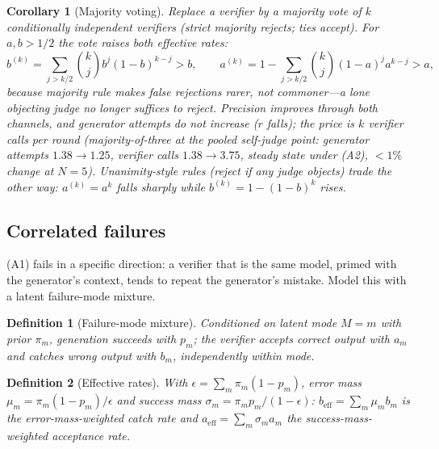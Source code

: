 \documentclass[10pt]{article}
\newtheorem{corollary}{Corollary}
\newtheorem{definition}{Definition}
\begin{document}
\begin{corollary}[Majority voting]\label{cor:majority}
Replace a verifier by a majority vote of $k$ conditionally
independent verifiers (strict majority rejects; ties accept).  For
$a, b > 1/2$ the vote raises \emph{both} effective rates:
\[
b^{(k)} = \sum_{j>k/2}\binom{k}{j}b^j(1-b)^{k-j} > b, \qquad
a^{(k)} = 1 - \sum_{j>k/2}\binom{k}{j}(1-a)^j a^{k-j} > a,
\]
because majority rule makes false rejections \emph{rarer}, not
commoner---a lone objecting judge no longer suffices to reject.
Precision improves through both channels, and generator attempts
do not increase ($r$ falls); the price is $k$ verifier calls per
round (majority-of-three at the pooled self-judge point:
generator attempts $1.38 \to 1.25$, verifier calls $1.38 \to
3.75$, steady state under (A2), $<1\%$ change at $N{=}5$).
Unanimity-style rules (reject if any judge objects) trade the
other way: $a^{(k)} = a^k$ falls sharply while $b^{(k)} =
1-(1-b)^k$ rises.
\end{corollary}

\subsection{Correlated failures}\label{sec:mixture}

(A1) fails in a specific direction: a verifier that is the same
model, primed with the generator's context, tends to repeat the
generator's mistake.  Model this with a latent failure-mode mixture.

\begin{definition}[Failure-mode mixture]\label{def:mixture}
Conditioned on latent mode $M=m$ with prior $\pi_m$, generation
succeeds with $p_m$; the verifier accepts correct output with
$a_m$ and catches wrong output with $b_m$, independently within
mode.
\end{definition}

\begin{definition}[Effective rates]\label{def:beff}
With $\epsilon = \sum_m \pi_m(1-p_m)$, error mass
$\mu_m = \pi_m(1-p_m)/\epsilon$ and success mass
$\sigma_m = \pi_m p_m/(1-\epsilon)$:
$b_{\mathrm{eff}} = \sum_m \mu_m b_m$ is the error-mass-weighted
catch rate and $a_{\mathrm{eff}} = \sum_m \sigma_m a_m$ the
success-mass-weighted acceptance rate.
\end{definition}
\end{document}
